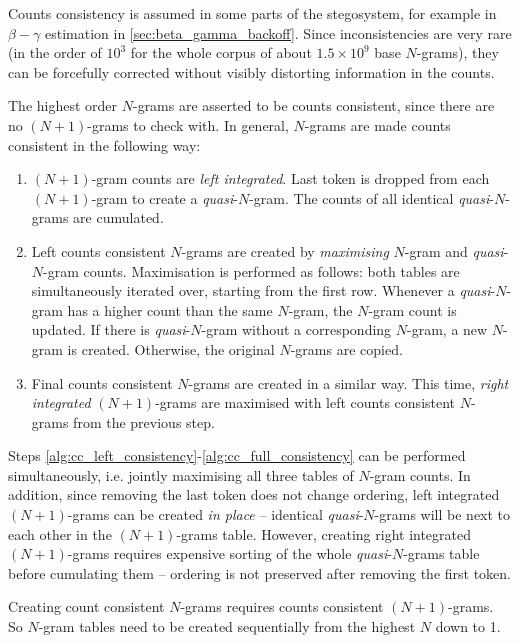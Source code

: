 \documentclass[draft]{IIBproject}
\makeatletter
\DeclareRobustCommand*{\ie}{i.e.\@\xspace}
\DeclareRobustCommand{\npgram}{\mbox{$(N{+}1)$-gram}\@\xspace}
\DeclareRobustCommand{\npgrams}{\mbox{$(N{+}1)$-grams}\@\xspace}
\makeatother
\begin{document}
Counts consistency is assumed in some parts of the stegosystem, for example in $\beta{-}\gamma$ estimation in \cref{sec:beta_gamma_backoff}. Since inconsistencies are very rare (in the order of $10^3$ for the whole corpus of about $1.5 \times 10^9$ base $N$-grams), they can be forcefully corrected without visibly distorting information in the counts.

The highest order $N$-grams are asserted to be counts consistent, since there are no \npgrams to check with. In general, $N$-grams are made counts consistent in the following way:

\begin{enumerate}
\item \label{alg:cc_left_integration} \npgram counts are \emph{left integrated}. Last token is dropped from each \npgram to create a \emph{quasi}-$N$-gram. The counts of all identical \emph{quasi}-$N$-grams are cumulated.
\item \label{alg:cc_left_consistency} Left counts consistent $N$-grams are created by \emph{maximising} $N$-gram and \emph{quasi}-$N$-gram counts. Maximisation is performed as follows: both tables are simultaneously iterated over, starting from the first row. Whenever a \emph{quasi}-$N$-gram has a higher count than the same $N$-gram, the $N$-gram count is updated. If there is \emph{quasi}-$N$-gram without a corresponding $N$-gram, a new $N$-gram is created. Otherwise, the original $N$-grams are copied.
\item \label{alg:cc_full_consistency} Final counts consistent $N$-grams are created in a similar way. This time, \emph{right integrated} \npgrams are maximised with left counts consistent $N$-grams from the previous step.
\end{enumerate}

Steps \ref{alg:cc_left_consistency}-\ref{alg:cc_full_consistency} can be performed simultaneously, \ie jointly maximising all three tables of $N$-gram counts. In addition, since removing the last token does not change ordering, left integrated \npgrams can be created \emph{in place} -- identical \emph{quasi}-$N$-grams will be next to each other in the \npgrams table. However, creating right integrated \npgrams requires expensive sorting of the whole \emph{quasi}-$N$-grams table before cumulating them -- ordering is not preserved after removing the first token.

Creating count consistent $N$-grams requires counts consistent \npgrams. So $N$-gram tables need to be created sequentially from the highest $N$ down to 1.
\end{document}
